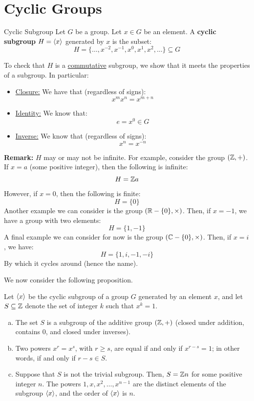 \documentclass[letterpaper]{article}
\begin{document}

\newpage 
\section{Cyclic Groups} 
\begin{definition}{Cyclic Subgroup}{}
    Let $G$ be a group. Let $x \in G$ be an element. A \textbf{cyclic subgroup} $H = \langle x \rangle$ generated by $x$ is the subset: 
    \[H = \{\dots, x^{-2}, x^{-1}, x^0, x^1, x^2, \dots\} \subseteq G\]
\end{definition}
To check that $H$ is a \underline{commutative} subgroup, we show that it meets the properties of a subgroup. In particular:  
\begin{itemize}
    \item \underline{Closure:} We have that (regardless of signs): 
    \[x^m x^n = x^{m + n}\]

    \item \underline{Identity:} We know that: 
    \[e = x^0 \in G\]

    \item \underline{Inverse:} We know that (regardless of signs): 
    \[x^n = x^{-n}\]
\end{itemize}

\textbf{Remark:} $H$ may or may not be infinite. For example, consider the group $(\mathbb{Z}, +)$. If $x = a$ (some positive integer), then the following is infinite: 
\[H = \mathbb{Z} a\]
However, if $x = 0$, then the following is finite: 
\[H = \{0\}\] 
Another example we can consider is the group $(\mathbb{R} - \{0\}, \times)$. Then, if $x = -1$, we have a group with two elements: 
\[H = \{1, -1\}\]
A final example we can consider for now is the group $(\mathbb{C} - \{0\}, \times)$. Then, if $x = i$, we have: 
\[H = \{1, i, -1, -i\}\]
By which it cycles around (hence the name). 

\bigskip 

We now consider the following proposition.
\begin{mdframed}
    \begin{proposition}
        Let $\langle x \rangle$ be the cyclic subgroup of a group $G$ generated by an element $x$, and let $S \subseteq \mathbb{Z}$ denote the set of integer $k$ such that $x^k = 1$.
        \begin{enumerate}[(a)]
            \item The set $S$ is a subgroup of the additive group $(\mathbb{Z}, +)$ (closed under addition, contains 0, and closed under inverses). 
            \item Two powers $x^r = x^s$, with $r \geq s$, are equal if and only if $x^{r - s} = 1$; in other words, if and only if $r - s \in S$. 
            \item Suppose that $S$ is not the trivial subgroup. Then, $S = \mathbb{Z} n$ for some positive integer $n$. The powers $1, x, x^2, \dots, x^{n - 1}$ are the distinct elements of the subgroup $\langle x \rangle$, and the order of $\langle x \rangle$ is $n$. 
        \end{enumerate}
    \end{proposition}
\end{mdframed}
\end{document}
